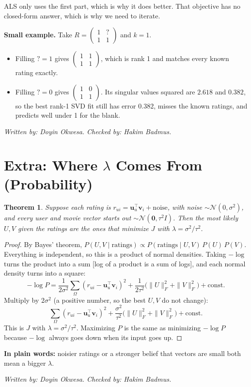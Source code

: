 \documentclass[11pt]{article}
\newtheorem{theorem}{Theorem}
\theoremstyle{definition}
\newcommand{\checked}[2]{\par\smallskip\noindent\textit{Written by: #1. \quad Checked by: #2.}\par}
\begin{document}
ALS only uses the first part, which is why it does better. That objective has no closed-form answer, which is why we need to iterate.

\textbf{Small example.} Take $R=\begin{pmatrix}1&?\\1&1\end{pmatrix}$ and $k=1$.
\begin{itemize}[nosep]
\item Filling $?=1$ gives $\begin{pmatrix}1&1\\1&1\end{pmatrix}$, which is rank 1 and matches every known rating exactly.
\item Filling $?=0$ gives $\begin{pmatrix}1&0\\1&1\end{pmatrix}$. Its singular values squared are $2.618$ and $0.382$, so the best rank-1 SVD fit still has error $0.382$, misses the known ratings, and predicts well under 1 for the blank.
\end{itemize}
\checked{Doyin Okwesa}{Hakim Badmus}

\section{Extra: Where $\lambda$ Comes From (Probability)}
\begin{theorem}
Suppose each rating is $r_{ui}=\mathbf u_u^\top\mathbf v_i+\text{noise}$, with noise $\sim\mathcal N(0,\sigma^2)$, and every user and movie vector starts out $\sim\mathcal N(\mathbf 0,\tau^2 I)$. Then the most likely $U,V$ given the ratings are the ones that minimize $J$ with $\lambda=\sigma^2/\tau^2$.
\end{theorem}
\begin{proof}
By Bayes' theorem, $P(U,V\mid\text{ratings})\propto P(\text{ratings}\mid U,V)\,P(U)\,P(V)$. Everything is independent, so this is a product of normal densities. Taking $-\log$ turns the product into a sum [log of a product is a sum of logs], and each normal density turns into a square:
\[
-\log P=\frac{1}{2\sigma^2}\sum_{\Omega}(r_{ui}-\mathbf u_u^\top\mathbf v_i)^2+\frac{1}{2\tau^2}\big(\|U\|_F^2+\|V\|_F^2\big)+\text{const}.
\]
Multiply by $2\sigma^2$ (a positive number, so the best $U,V$ do not change):
\[
\sum_{\Omega}(r_{ui}-\mathbf u_u^\top\mathbf v_i)^2+\frac{\sigma^2}{\tau^2}\big(\|U\|_F^2+\|V\|_F^2\big)+\text{const}.
\]
This is $J$ with $\lambda=\sigma^2/\tau^2$. Maximizing $P$ is the same as minimizing $-\log P$ because $-\log$ always goes down when its input goes up.
\end{proof}
\noindent\textbf{In plain words:} noisier ratings or a stronger belief that vectors are small both mean a bigger $\lambda$.
\checked{Doyin Okwesa}{Hakim Badmus}
\end{document}
